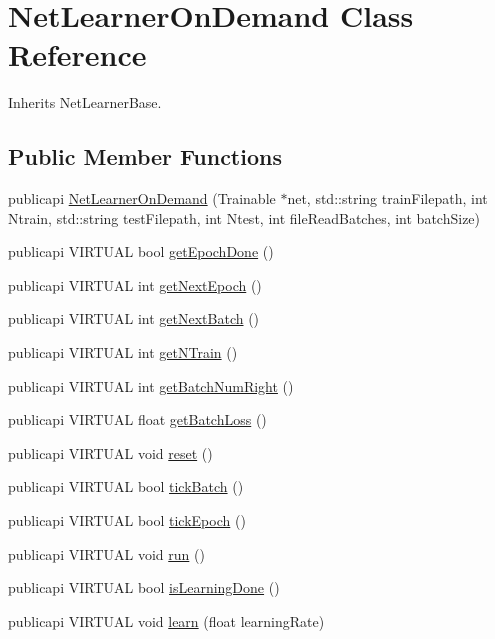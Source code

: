 \hypertarget{classNetLearnerOnDemand}{\section{Net\-Learner\-On\-Demand Class Reference}
\label{classNetLearnerOnDemand}
}


Inherits Net\-Learner\-Base.

\subsection*{Public Member Functions}
\begin{DoxyCompactItemize}
\item 
publicapi \hyperlink{classNetLearnerOnDemand_a251a1fde7994aad4d792ab4bfb5e2108}{Net\-Learner\-On\-Demand} (Trainable $\ast$net, std\-::string train\-Filepath, int Ntrain, std\-::string test\-Filepath, int Ntest, int file\-Read\-Batches, int batch\-Size)
\item 
publicapi V\-I\-R\-T\-U\-A\-L bool \hyperlink{classNetLearnerOnDemand_ab90f454677d0fe20ecf143df81271c40}{get\-Epoch\-Done} ()
\item 
publicapi V\-I\-R\-T\-U\-A\-L int \hyperlink{classNetLearnerOnDemand_a0f6804f7ca535f9930d07e9c5a4808f1}{get\-Next\-Epoch} ()
\item 
publicapi V\-I\-R\-T\-U\-A\-L int \hyperlink{classNetLearnerOnDemand_a2b53806f6af0cdbcb67f1606eccc8542}{get\-Next\-Batch} ()
\item 
publicapi V\-I\-R\-T\-U\-A\-L int \hyperlink{classNetLearnerOnDemand_a24c4c1daa5d9e5a57cffe0820be4f180}{get\-N\-Train} ()
\item 
publicapi V\-I\-R\-T\-U\-A\-L int \hyperlink{classNetLearnerOnDemand_aecf6366ca133f63054ffe6088c781a3c}{get\-Batch\-Num\-Right} ()
\item 
publicapi V\-I\-R\-T\-U\-A\-L float \hyperlink{classNetLearnerOnDemand_af50745f9af1104717584237b996ad67b}{get\-Batch\-Loss} ()
\item 
publicapi V\-I\-R\-T\-U\-A\-L void \hyperlink{classNetLearnerOnDemand_a738949f834d0bd01f09f2ff6c1e1b180}{reset} ()
\item 
publicapi V\-I\-R\-T\-U\-A\-L bool \hyperlink{classNetLearnerOnDemand_a4c94046a8851a29edf9e1ca901a541f2}{tick\-Batch} ()
\item 
publicapi V\-I\-R\-T\-U\-A\-L bool \hyperlink{classNetLearnerOnDemand_af4489186b9479b07ca395eea8617ec07}{tick\-Epoch} ()
\item 
publicapi V\-I\-R\-T\-U\-A\-L void \hyperlink{classNetLearnerOnDemand_a2f47f4bf69cd458aa27638da242879c1}{run} ()
\item 
publicapi V\-I\-R\-T\-U\-A\-L bool \hyperlink{classNetLearnerOnDemand_a499c7487bb3a56298ddefdd71e3e58f2}{is\-Learning\-Done} ()
\item 
publicapi V\-I\-R\-T\-U\-A\-L void \hyperlink{classNetLearnerOnDemand_ac4196cd28271f7401a3f9a066975e5ee}{learn} (float learning\-Rate)
\end{DoxyCompactItemize}


